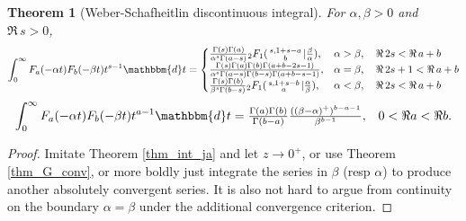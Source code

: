 \documentclass[12pt]{article}
\newcommand{\dd}[0] {\mathbbm{d}}
\numberwithin{equation}{section}
\newtheorem{theorem}{Theorem}[section]
\newcommand{\Head}[3] {{}_{#1}{#2}_{#3}}
\newcommand{\ArgS}[3] {( \begin{smallmatrix} #1 \\ #2 \end{smallmatrix} | {#3})}
\newcommand{\HypJ}[2] {F_{#1}(#2)}
\begin{document}
\begin{theorem}[Weber-Schafheitlin discontinuous integral]
\label{thm_int_jajb}
For $\alpha,\beta > 0$ and $\Re \, s > 0$,
\begin{equation*}
\int_{0}^{\infty} \HypJ{a}{-\alpha t} \HypJ{b}{-\beta t} t^{s-1} \dd t = 
\begin{cases}
\tfrac{\Gamma(s) \Gamma(a)}{\alpha^s \Gamma(a-s)}  \Head{2}{F}{1} \ArgS{s,1+s-a}{b}{\tfrac{\beta}{\alpha}}\text{,} & \alpha > \beta, \quad \Re\, 2s < \Re \, a + b\\
\tfrac{\Gamma(s) \Gamma(a)\Gamma(b)\Gamma(a+b-2s-1)}{\alpha^s \Gamma(a-s)\Gamma(b-s)\Gamma(a+b-s-1)}\text{,} & \alpha = \beta, \quad \Re \, 2s+1 < \Re \, a + b\\
\tfrac{\Gamma(s) \Gamma(b)}{\beta^s \Gamma(b-s)}  \Head{2}{F}{1} \ArgS{s,1+s-b}{a}{\tfrac{\alpha}{\beta}}\text{,} & \alpha < \beta, \quad \Re\, 2s < \Re \, a + b
\end{cases}
\end{equation*}
\begin{equation*}
\int_{0}^{\infty} \HypJ{a}{-\alpha t} \HypJ{b}{-\beta t} t^{a-1} \dd t =
\tfrac{\Gamma(a)\Gamma(b)}{\Gamma(b-a)} \tfrac{ ((\beta - \alpha)^{+})^{b-a-1} }{ \beta^{b-1} } \text{,} \quad 0 < \Re a < \Re b\text{.}
\end{equation*}
\end{theorem}
\begin{proof}
Imitate Theorem \ref{thm_int_ja} and let $z \to 0^+$, or use Theorem \ref{thm_G_conv}, or more boldly just integrate the series in $\beta$ (resp $\alpha$) to produce another absolutely convergent series. It is also not hard to argue from continuity on the boundary $\alpha = \beta$ under the additional convergence criterion.
\end{proof}
\end{document}
